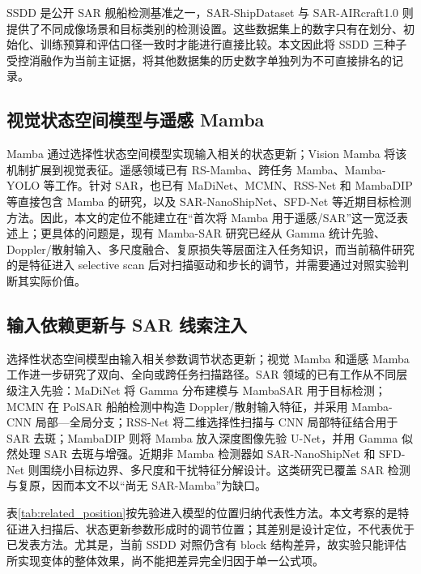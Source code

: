\documentclass[UTF8,12pt,a4paper]{ctexart}
\begin{document}
SSDD 是公开 SAR 舰船检测基准之一\cite{ssdd2017,ssdd2021}，SAR-ShipDataset 与 SAR-AIRcraft1.0 则提供了不同成像场景和目标类别的检测设置\cite{sardataset,saraircraft}。这些数据集上的数字只有在划分、初始化、训练预算和评估口径一致时才能进行直接比较。本文因此将 SSDD 三种子受控消融作为当前主证据，将其他数据集的历史数字单独列为不可直接排名的记录。

\subsection{视觉状态空间模型与遥感 Mamba}
Mamba 通过选择性状态空间模型实现输入相关的状态更新\cite{gu2023mamba}；Vision Mamba 将该机制扩展到视觉表征\cite{liu2024visionmamba}。遥感领域已有 RS-Mamba、跨任务 Mamba、Mamba-YOLO 等工作\cite{rs_mamba,rstmtmamba,mambayolo}。针对 SAR，也已有 MaDiNet、MCMN、RSS-Net 和 MambaDIP 等直接包含 Mamba 的研究，以及 SAR-NanoShipNet、SFD-Net 等近期目标检测方法\cite{madinet,mcmn,rssnet,mambadip,sarnano,sfdnet}。因此，本文的定位不能建立在“首次将 Mamba 用于遥感/SAR”这一宽泛表述上；更具体的问题是，现有 Mamba-SAR 研究已经从 Gamma 统计先验、Doppler/散射输入、多尺度融合、复原损失等层面注入任务知识，而当前稿件研究的是特征进入 selective scan 后对扫描驱动和步长的调节，并需要通过对照实验判断其实际价值。

\subsection{输入依赖更新与 SAR 线索注入}
选择性状态空间模型由输入相关参数调节状态更新；视觉 Mamba 和遥感 Mamba 工作进一步研究了双向、全向或跨任务扫描路径\cite{gu2023mamba,liu2024visionmamba,rs_mamba,rstmtmamba}。SAR 领域的已有工作从不同层级注入先验：MaDiNet 将 Gamma 分布建模与 MambaSAR 用于目标检测；MCMN 在 PolSAR 船舶检测中构造 Doppler/散射输入特征，并采用 Mamba-CNN 局部—全局分支；RSS-Net 将二维选择性扫描与 CNN 局部特征结合用于 SAR 去斑；MambaDIP 则将 Mamba 放入深度图像先验 U-Net，并用 Gamma 似然处理 SAR 去斑与增强\cite{madinet,mcmn,rssnet,mambadip}。近期非 Mamba 检测器如 SAR-NanoShipNet 和 SFD-Net 则围绕小目标边界、多尺度和干扰特征分解设计\cite{sarnano,sfdnet}。这类研究已覆盖 SAR 检测与复原，因而本文不以“尚无 SAR-Mamba”为缺口。

表\ref{tab:related_position}按先验进入模型的位置归纳代表性方法。本文考察的是特征进入扫描后、状态更新参数形成时的调节位置；其差别是设计定位，不代表优于已发表方法。尤其是，当前 SSDD 对照仍含有 block 结构差异，故实验只能评估所实现变体的整体效果，尚不能把差异完全归因于单一公式项。
\end{document}
